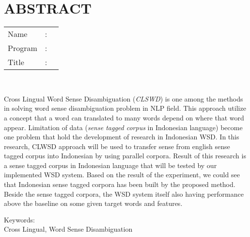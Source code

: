 %
%
%

\chapter*{ABSTRACT}

\vspace*{0.2cm}

\noindent \begin{tabular}{l l p{11.0cm}}
	Name&: & \penulis \\
	Program&: & \programEng \\
	Title&: & \judulInggris \\
\end{tabular} \\ 

\vspace*{0.5cm}

\noindent 
Cross Lingual Word Sense Disambiguation (\textit{CLSWD}) is one among the methods in solving word sense disambiguation problem in NLP field. This approach utilize a concept that a word can translated to many words depend on where that word appear. Limitation of data (\textit{sense tagged corpus} in Indonesian language) become one problem that hold the development of research in Indonesian WSD. In this research, CLWSD approach will be used to transfer sense from english sense tagged corpus into Indonesian by using parallel corpora. Result of this research is a sense tagged corpus in Indonesian language that will be tested by our implemented WSD system. Based on the result of the experiment, we could see that Indonesian sense tagged corpora has been built by the proposed method. Beside the sense tagged corpora, the WSD system itself also having performance above the baseline on some given target words and features.
\vspace*{0.2cm}

\noindent Keywords: \\ 
\noindent Cross Lingual, Word Sense Disambiguation

\newpage
